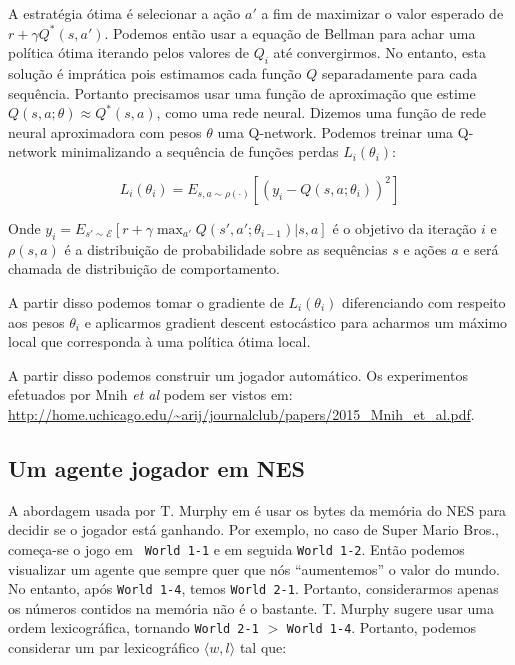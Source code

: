 \documentclass[a4paper,10pt]{article}
\theoremstyle{plain}
\begin{document}
A estratégia ótima é selecionar a ação $a'$ a fim de maximizar o valor esperado de $r+\gamma Q^*(s,
a')$. Podemos então usar a equação de Bellman para achar uma política ótima iterando pelos valores
de $Q_i$ até convergirmos. No entanto, esta solução é imprática pois estimamos cada função $Q$
separadamente para cada sequência. Portanto precisamos usar uma função de aproximação que estime
$Q(s,a;\theta) \approx Q^*(s,a)$, como uma rede neural. Dizemos uma função de rede neural
aproximadora com pesos $\theta$ uma Q-network. Podemos treinar uma Q-network minimalizando a
sequência de funções perdas $L_i(\theta_i)$:

\begin{equation*}
  L_i(\theta_i) = E_{s,a \sim \rho(\cdot)} \left[(y_i - Q(s,a;\theta_i))^2\right]
\end{equation*}

Onde $y_i = E_{s' \sim \mathcal{E}} [r+\gamma\max_{a'}Q(s',a';\theta_{i-1})|s,a]$ é o objetivo da
iteração $i$ e $\rho(s, a)$ é a distribuição de probabilidade sobre as sequências $s$ e ações $a$
e será chamada de distribuição de comportamento.

A partir disso podemos tomar o gradiente de $L_i(\theta_i)$ diferenciando com respeito aos pesos
$\theta_i$ e aplicarmos gradient descent estocástico para acharmos um máximo local que corresponda
à uma política ótima local.

A partir disso podemos construir um jogador automático. Os experimentos efetuados por Mnih \textit{
et al} podem ser vistos em:
\url{http://home.uchicago.edu/~arij/journalclub/papers/2015\_Mnih\_et\_al.pdf}.

\subsection{Um agente jogador em NES}

A abordagem usada por T. Murphy em \cite{dr-murphy} é usar os bytes da memória do NES para decidir
se o jogador está ganhando. Por exemplo, no caso de Super Mario Bros., começa-se o jogo em \texttt{
World 1-1} e em seguida \texttt{World 1-2}. Então podemos visualizar um agente que sempre quer que
nós ``aumentemos'' o valor do mundo. No entanto, após \texttt{World 1-4}, temos \texttt{World
2-1}. Portanto, considerarmos apenas os números contidos na memória não é o bastante. T. Murphy
sugere usar uma ordem lexicográfica, tornando \texttt{World 2-1} $>$ \texttt{World 1-4}. Portanto,
podemos considerar um par lexicográfico $\langle w, l \rangle$ tal que:
\end{document}
